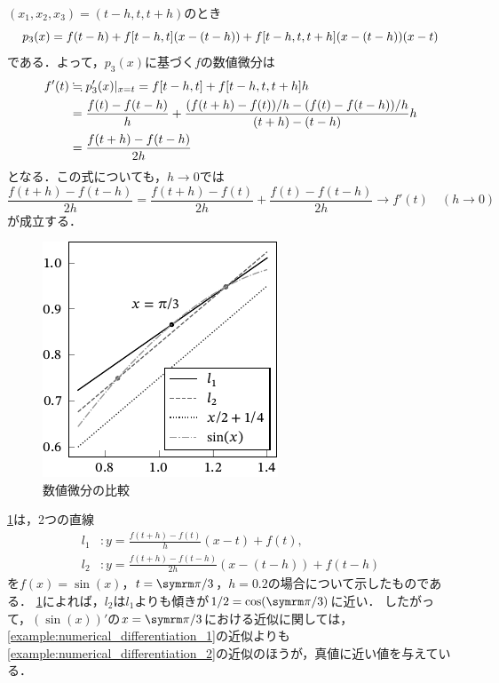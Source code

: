 \documentclass[../../main]{subfiles}
\begin{document}
\begin{example}
\label{example:numerical_differentiation_2}
\((x_1,x_2,x_3)=(t-h,t,t+h)\)のとき
\[
  p_3(x) = f(t-h)+\divdiff[f]{t-h,t}\pqty*{x-(t-h)}+\divdiff[f]{t-h,t,t+h}\pqty*{x-(t-h)}(x-t)
\]
である．よって，\(p_3(x)\)に基づく\(f\)の数値微分は
\begin{align*}
  f'(t) &\fallingdotseq \eval{p_3'(x)}_{x=t} = \divdiff[f]{t-h,t}+\divdiff[f]{t-h,t,t+h}h \\
  &= \frac{f(t)-f(t-h)}{h}+\frac{(f(t+h)-f(t))/h-(f(t)-f(t-h))/h}{(t+h)-(t-h)}h \\
  &= \frac{f(t+h)-f(t-h)}{2h}  
\end{align*}
となる．この式についても，\(h\to 0\)では
\[
  \frac{f(t+h)-f(t-h)}{2h} = \frac{f(t+h)-f(t)}{2h}+\frac{f(t)-f(t-h)}{2h}
  \to f'(t)\quad(h\to 0)
\]
が成立する．
\end{example}

\begin{figure}[htbp]
  \centering
  \includegraphics{differentiation.pdf}
  \caption{数値微分の比較}
  \label{figure:differentiation}
\end{figure}

\cref{figure:differentiation}は，2つの直線
\begin{align*}
  l_1 &\colon y=\frac{f(t+h)-f(t)}{h}(x-t)+f(t), \\
  l_2 &\colon y=\frac{f(t+h)-f(t-h)}{2h}(x-(t-h))+f(t-h)
\end{align*}
を\(f(x)=\sin(x)\)，\(t=\krez/3\)，\(h=0.2\)の場合について示したものである．
\cref{figure:differentiation}によれば，\(l_2\)は\(l_1\)よりも傾きが\(1/2=\cos(\krez/3)\)に近い．
したがって，\((\sin(x))'\)の\(x=\krez/3\)における近似に関しては，\cref{example:numerical_differentiation_1}の近似よりも\cref{example:numerical_differentiation_2}の近似のほうが，真値に近い値を与えている．
\end{document}
